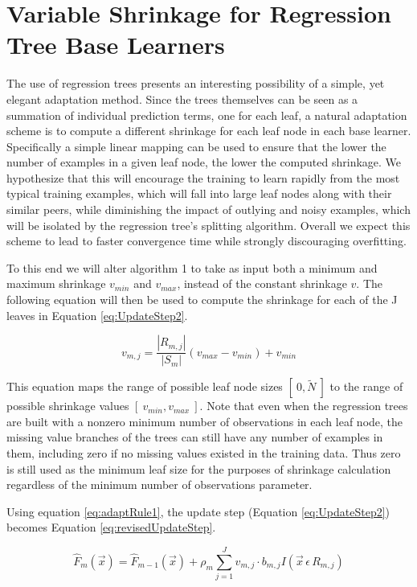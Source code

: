 \documentclass[9pt, conference]{IEEEtran}
\begin{document}
\section{Variable Shrinkage for Regression Tree Base Learners}
\label{sec:VariableLR}
The use of regression trees presents an interesting possibility of a simple, yet elegant adaptation method. Since the trees themselves can be seen as a summation of individual prediction terms, one for each leaf, a natural adaptation scheme is to compute a different shrinkage for each leaf node in each base learner. Specifically a simple linear mapping can be used to ensure that the lower the number of examples in a given leaf node, the lower the computed shrinkage. We hypothesize that this will encourage the training to learn rapidly from the most typical training examples, which will fall into large leaf nodes along with their similar peers, while diminishing the impact of outlying and noisy examples, which will be isolated by the regression tree's splitting algorithm. Overall we expect this scheme to lead to faster convergence time while strongly discouraging overfitting.

To this end we will alter algorithm 1 to take as input both a minimum and maximum shrinkage \(v_{min}\) and \(v_{max}\), instead of the constant shrinkage \(v\). The following equation will then be used to compute the shrinkage for each of the J leaves in Equation \ref{eq:UpdateStep2}.
	
\begin{equation}
v_{m,j} = \frac{|R_{m,j}|}{{|S_m|}}(v_{max} - v_{min})  + v_{min}
	\label{eq:adaptRule1}
\end{equation}

This equation maps the range of possible leaf node sizes \([\ 0, \tilde{N}\ ]\) to the range of possible shrinkage values \([\ v_{min}, v_{max}\ ]\). Note that even when the regression trees are built with a nonzero minimum number of observations in each leaf node, the missing value branches of the trees can still have any number of examples in them, including zero if no missing values existed in the training data. Thus zero is still used as the minimum leaf size for the purposes of shrinkage calculation regardless of the minimum number of observations parameter. 

Using equation \ref{eq:adaptRule1}, the update step (Equation \ref{eq:UpdateStep2}) becomes Equation \ref{eq:revisedUpdateStep}.

\begin{equation}
	\hat{F}_m(\vec{x}) = \hat{F}_{m-1}(\vec{x}) + \rho_m\sum_{j=1}^{J}v_{m,j}  \cdot  b_{m,j}I(\vec{x} \, \epsilon \, R_{m,j})
	\label{eq:revisedUpdateStep}
\end{equation}
	
\end{document}
